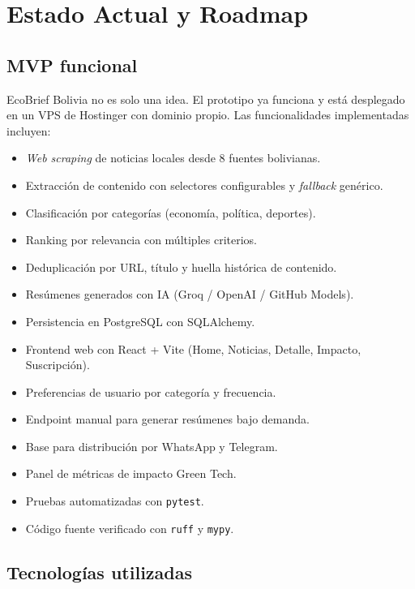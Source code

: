 \chapter{Estado Actual y Roadmap}

\section{MVP funcional}

EcoBrief Bolivia no es solo una idea. El prototipo ya funciona y est\'a desplegado en un VPS de Hostinger con dominio propio. Las funcionalidades implementadas incluyen:

\begin{itemize}[nosep]
    \item \textit{Web scraping} de noticias locales desde 8 fuentes bolivianas.
    \item Extracci\'on de contenido con selectores configurables y \textit{fallback} gen\'erico.
    \item Clasificaci\'on por categor\'ias (econom\'ia, pol\'itica, deportes).
    \item Ranking por relevancia con m\'ultiples criterios.
    \item Deduplicaci\'on por URL, t\'itulo y huella hist\'orica de contenido.
    \item Res\'umenes generados con IA (Groq / OpenAI / GitHub Models).
    \item Persistencia en PostgreSQL con SQLAlchemy.
    \item Frontend web con React + Vite (Home, Noticias, Detalle, Impacto, Suscripci\'on).
    \item Preferencias de usuario por categor\'ia y frecuencia.
    \item Endpoint manual para generar res\'umenes bajo demanda.
    \item Base para distribuci\'on por WhatsApp y Telegram.
    \item Panel de m\'etricas de impacto Green Tech.
    \item Pruebas automatizadas con \texttt{pytest}.
    \item C\'odigo fuente verificado con \texttt{ruff} y \texttt{mypy}.
\end{itemize}

\section{Tecnolog\'ias utilizadas}

